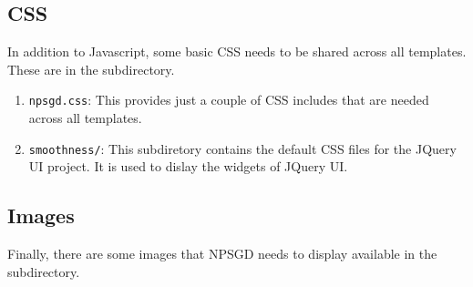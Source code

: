\documentclass{article}
\begin{document}
\subsection{CSS}
In addition to Javascript, some basic CSS needs to be shared across all
templates. These are in the  subdirectory.
\begin{enumerate}
    \item \texttt{npsgd.css}: This provides just a couple of CSS includes that
    are needed across all templates.
    \item \texttt{smoothness/}: This subdiretory contains the default CSS files
    for the JQuery UI project. It is used to dislay the widgets of JQuery UI.
\end{enumerate}

\subsection{Images}
Finally, there are some images that NPSGD needs to display available in the
 subdirectory. 
\end{document}
